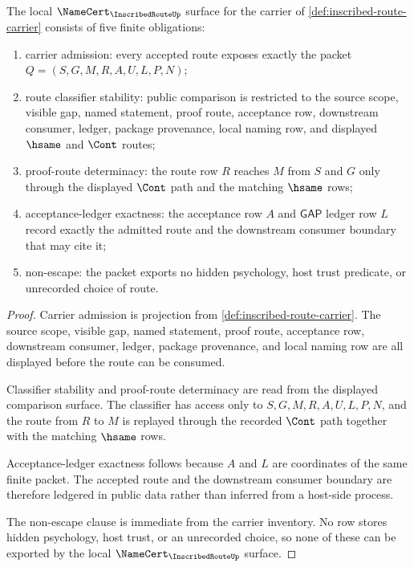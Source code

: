 \begin{theorem}
\label{thm:inscribed-route-namecert-obligations}
The local $\NameCert_{\InscribedRouteUp}$ surface for the carrier of \autoref{def:inscribed-route-carrier} consists of five finite obligations:
\begin{enumerate}
\item carrier admission: every accepted route exposes exactly the packet $Q=(S,G,M,R,A,U,L,P,N)$;
\item route classifier stability: public comparison is restricted to the source scope, visible gap, named statement, proof route, acceptance row, downstream consumer, ledger, package provenance, local naming row, and displayed $\hsame$ and $\Cont$ routes;
\item proof-route determinacy: the route row $R$ reaches $M$ from $S$ and $G$ only through the displayed $\Cont$ path and the matching $\hsame$ rows;
\item acceptance-ledger exactness: the acceptance row $A$ and $\mathsf{GAP}$ ledger row $L$ record exactly the admitted route and the downstream consumer boundary that may cite it;
\item non-escape: the packet exports no hidden psychology, host trust predicate, or unrecorded choice of route.
\end{enumerate}
\end{theorem}
\begin{proof}
Carrier admission is projection from \autoref{def:inscribed-route-carrier}. The source scope, visible gap, named statement, proof route, acceptance row, downstream consumer, ledger, package provenance, and local naming row are all displayed before the route can be consumed.

Classifier stability and proof-route determinacy are read from the displayed comparison surface. The classifier has access only to $S,G,M,R,A,U,L,P,N$, and the route from $R$ to $M$ is replayed through the recorded $\Cont$ path together with the matching $\hsame$ rows.

Acceptance-ledger exactness follows because $A$ and $L$ are coordinates of the same finite packet. The accepted route and the downstream consumer boundary are therefore ledgered in public data rather than inferred from a host-side process.

The non-escape clause is immediate from the carrier inventory. No row stores hidden psychology, host trust, or an unrecorded choice, so none of these can be exported by the local $\NameCert_{\InscribedRouteUp}$ surface.
\end{proof}


